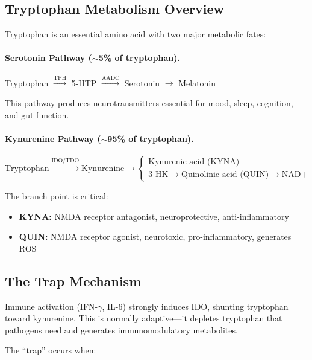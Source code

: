 \subsection{Tryptophan Metabolism Overview}

Tryptophan is an essential amino acid with two major metabolic fates:

\paragraph{Serotonin Pathway ($\sim$5\% of tryptophan).}
\begin{center}
Tryptophan $\xrightarrow{\text{TPH}}$ 5-HTP $\xrightarrow{\text{AADC}}$ Serotonin $\rightarrow$ Melatonin
\end{center}
This pathway produces neurotransmitters essential for mood, sleep, cognition, and gut function.

\paragraph{Kynurenine Pathway ($\sim$95\% of tryptophan).}
\begin{center}
\[
\text{Tryptophan} \xrightarrow{\text{IDO/TDO}} \text{Kynurenine} \rightarrow \begin{cases} \text{Kynurenic acid (KYNA)} \\ \text{3-HK} \rightarrow \text{Quinolinic acid (QUIN)} \rightarrow \text{NAD+} \end{cases}
\]
\end{center}

The branch point is critical:
\begin{itemize}
    \item \textbf{KYNA:} NMDA receptor antagonist, neuroprotective, anti-inflammatory
    \item \textbf{QUIN:} NMDA receptor agonist, neurotoxic, pro-inflammatory, generates ROS
\end{itemize}

\subsection{The Trap Mechanism}

Immune activation (IFN-$\gamma$, IL-6) strongly induces IDO, shunting tryptophan toward kynurenine. This is normally adaptive---it depletes tryptophan that pathogens need and generates immunomodulatory metabolites.

The ``trap'' occurs when:


